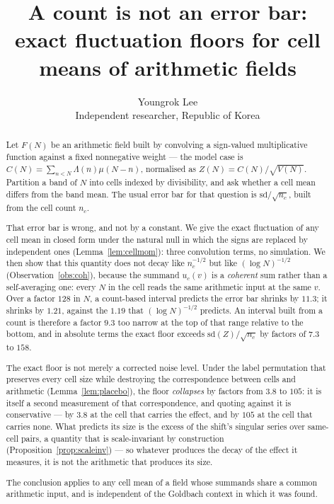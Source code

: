 \documentclass[11pt,a4paper]{article}
\title{A count is not an error bar:\\
exact fluctuation floors for cell means of arithmetic fields}
\author{Youngrok Lee\\
\small Independent researcher, Republic of Korea}
\date{}
\theoremstyle{plain}
\theoremstyle{definition}
\theoremstyle{remark}
\begin{document}
\maketitle

\begin{abstract}
Let $F(N)$ be an arithmetic field built by convolving a sign-valued
multiplicative function against a fixed nonnegative weight --- the
model case is $C(N)=\sum_{n<N}\Lambda(n)\mu(N-n)$, normalised as
$Z(N)=C(N)/\sqrt{V(N)}$. Partition a band of $N$ into cells indexed by
divisibility, and ask whether a cell mean differs from the band mean.
The usual error bar for that question is $\mathrm{sd}/\sqrt{n_c}$,
built from the cell count $n_c$.

That error bar is wrong, and not by a constant. We give the exact
fluctuation of any cell mean in closed form under the natural null in
which the signs are replaced by independent ones
(Lemma~\ref{lem:cellmom}): three convolution terms, no simulation. We
then show that this quantity does not decay like $n_c^{-1/2}$ but like
$(\log N)^{-1/2}$ (Observation~\ref{obs:coh}), because the summand
$u_c(v)$ is a \emph{coherent} sum rather than a self-averaging one:
every $N$ in the cell reads the same arithmetic input at the same
$v$. Over a factor $128$ in $N$, a count-based interval predicts the
error bar shrinks by $11.3$; it shrinks by $1.21$, against the $1.19$
that $(\log N)^{-1/2}$ predicts. An interval built from a count is
therefore a factor $9.3$ too narrow at the top of that range relative
to the bottom, and in absolute terms the exact floor exceeds
$\mathrm{sd}(Z)/\sqrt{n_c}$ by factors of $7.3$ to $158$.

The exact floor is not merely a corrected noise level. Under the
label permutation that preserves every cell size while destroying the
correspondence between cells and arithmetic (Lemma~\ref{lem:placebo}),
the floor \emph{collapses} by factors from $3.8$ to $105$: it is
itself a second measurement of that correspondence, and quoting
against it is conservative --- by $3.8$ at the cell that carries the
effect, and by $105$ at the cell that carries none. What
predicts its size is the excess of the shift's singular series over
same-cell pairs, a quantity that is scale-invariant by construction
(Proposition~\ref{prop:scaleinv}) --- so whatever produces the decay
of the effect it measures, it is not the arithmetic that produces its
size.

The conclusion applies to any cell mean of a field whose summands
share a common arithmetic input, and is independent of the Goldbach
context in which it was found.
\end{abstract}
\end{document}
